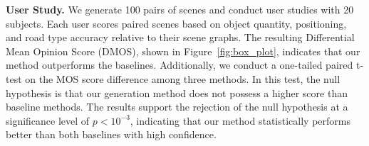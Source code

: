 \noindent \textbf{User Study.} We generate 100 pairs of scenes and conduct user studies with 20 subjects. 
Each user scores paired scenes based on object quantity, positioning, and road type accuracy relative to their scene graphs. The resulting Differential Mean Opinion Score (DMOS), shown in Figure~\ref{fig:box_plot}, indicates that our method outperforms the baselines. 
%
Additionally, we conduct a one-tailed paired t-test on the MOS score difference among three methods. In this test, the null hypothesis is that our generation method does not possess a higher score than baseline methods.
The results support the rejection of the null hypothesis at a significance level of $p < 10^{-3}$, indicating that our method statistically performs better than both baselines with high confidence.
